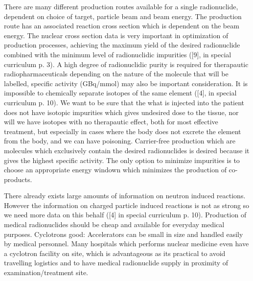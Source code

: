 \documentclass[a4paper,11pt,twoside]{book}
\begin{document}
There are many different production routes available for a single radionuclide, dependent on choice of target, particle beam and beam energy. The production route has an associated reaction cross section which is dependent on the beam energy. The nuclear cross section data is very important in optimization of production processes, achieving the maximum yield of the desired radionuclide combined with the minimum level of radionuclidic impurities ([9], in special curriculum p. 3). A high degree of radionuclidic purity is required for therapautic radiopharmaceuticals depending on the nature of the molecule that will be labelled, specific activity (GBq/mmol) may also be important consideration. It is impossible to chemically separate isotopes of the same element ([4], in special curriculum p. 10). We want to be sure that the what is injected into the patient does not have isotopic impurities which gives undesired dose to the tissue, nor will we have isotopes with no therapautic effect, both for most effective treatment, but especially in cases where the body does not excrete the element from the body, and we can have poisoning. Carrier-free production which are molecules which exclusively contain the desired radionuclides is desired because it gives the highest specific activity. The only option to minimize impurities is to choose an appropriate energy windown which minimizes the production of co-products. 

There already exists large amounts of information on neutron induced reactions. However the information on charged particle induced reactions is not as strong so we need more data on this behalf ([4] in special curriculum p. 10). Production of medical radionuclides should be cheap and available for everyday medical purposes. Cyclotrons good: Accelerators can be small in size and handled easily by medical personnel. Many hospitals which performs nuclear medicine even have a cyclotron facility on site, which is advantageous as its practical to avoid travelling logistics and to have medical radionuclide supply in proximity of examination/treatment site.  


\end{document}
